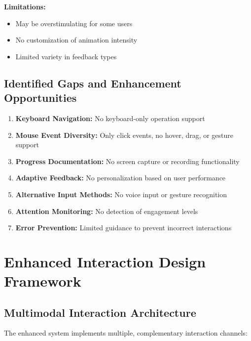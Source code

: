 \documentclass[12pt, a4paper]{article}
\begin{document}
\textbf{Limitations:}
\begin{itemize}[leftmargin=*]
    \item May be overstimulating for some users
    \item No customization of animation intensity
    \item Limited variety in feedback types
\end{itemize}

\subsection{Identified Gaps and Enhancement Opportunities}

\begin{enumerate}[leftmargin=*]
    \item \textbf{Keyboard Navigation:} No keyboard-only operation support
    \item \textbf{Mouse Event Diversity:} Only click events, no hover, drag, or gesture support
    \item \textbf{Progress Documentation:} No screen capture or recording functionality
    \item \textbf{Adaptive Feedback:} No personalization based on user performance
    \item \textbf{Alternative Input Methods:} No voice input or gesture recognition
    \item \textbf{Attention Monitoring:} No detection of engagement levels
    \item \textbf{Error Prevention:} Limited guidance to prevent incorrect interactions
\end{enumerate}

\newpage

\section{Enhanced Interaction Design Framework}

\subsection{Multimodal Interaction Architecture}

The enhanced system implements multiple, complementary interaction channels:
\end{document}
